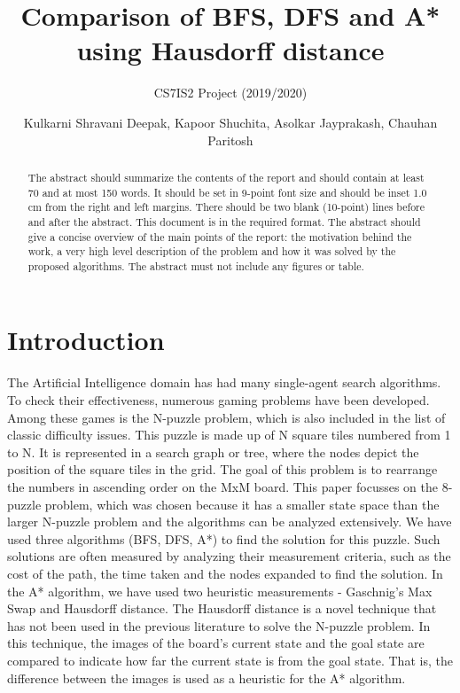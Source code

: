 \documentclass{svproc}
\begin{document}
\mainmatter
\title{Comparison of BFS, DFS and A* using Hausdorff distance}
\subtitle{CS7IS2 Project (2019/2020)}
\author{Kulkarni Shravani Deepak, Kapoor Shuchita, Asolkar Jayprakash, Chauhan Paritosh}



\maketitle

\begin{abstract}
The abstract should summarize the contents of the report and should contain at least 70 and at most 150 words. It should be set in 9-point font size and should be inset 1.0 cm from the right and left margins. There should be two blank (10-point) lines before and after the abstract. This document is in the required format. The abstract should give a concise overview of the main points of the report: the motivation behind the work, a very high level description of the problem and how it was solved by the proposed algorithms. The abstract must not include any figures or table.
\end{abstract}
%

 

\section{Introduction}
\noindent The Artificial Intelligence domain has had many single-agent search algorithms. To check their effectiveness, numerous gaming problems have been developed. Among these games is the N-puzzle problem, which is also included in the list of classic difficulty issues. This puzzle is made up of N square tiles numbered from 1 to N. It is represented in a search graph or tree, where the nodes depict the position of the square tiles in the grid. The goal of this problem is to rearrange the numbers in ascending order on the MxM board. This paper focusses on the 8-puzzle problem, which was chosen because it has a smaller state space than the larger N-puzzle problem and the algorithms can be analyzed extensively. We have used three algorithms (BFS, DFS, A*) to find the solution for this puzzle. Such solutions are often measured by analyzing their measurement criteria, such as the cost of the path, the time taken and the nodes expanded to find the solution. In the A* algorithm, we have used two heuristic measurements - Gaschnig’s Max Swap and Hausdorff distance. The Hausdorff distance is a novel technique that has not been used in the previous literature to solve the N-puzzle problem. In this technique, the images of the board's current state and the goal state are compared to indicate how far the current state is from the goal state. That is, the difference between the images is used as a heuristic for the A* algorithm. \\
\end{document}
